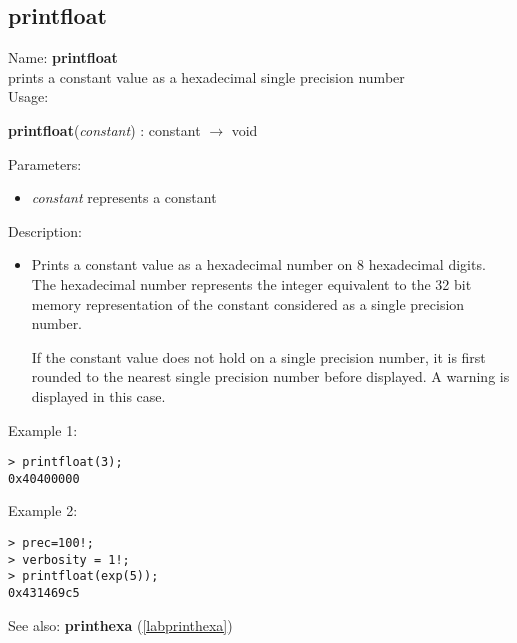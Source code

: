 \subsection{printfloat}
\label{labprintfloat}
\noindent Name: \textbf{printfloat}\\
prints a constant value as a hexadecimal single precision number\\

\noindent Usage: 
\begin{center}
\textbf{printfloat}(\emph{constant}) : \textsf{constant} $\rightarrow$ \textsf{void}\\
\end{center}
Parameters: 
\begin{itemize}
\item \emph{constant} represents a constant
\end{itemize}
\noindent Description: \begin{itemize}

\item Prints a constant value as a hexadecimal number on 8 hexadecimal
   digits. The hexadecimal number represents the integer equivalent to
   the 32 bit memory representation of the constant considered as a
   single precision number.
    
   If the constant value does not hold on a single precision number, it
   is first rounded to the nearest single precision number before
   displayed. A warning is displayed in this case.
\end{itemize}
\noindent Example 1: 
\begin{center}\begin{minipage}{15cm}\begin{Verbatim}[frame=single]
> printfloat(3);
0x40400000
\end{Verbatim}
\end{minipage}\end{center}
\noindent Example 2: 
\begin{center}\begin{minipage}{15cm}\begin{Verbatim}[frame=single]
> prec=100!;
> verbosity = 1!;
> printfloat(exp(5));
0x431469c5
\end{Verbatim}
\end{minipage}\end{center}
See also: \textbf{printhexa} (\ref{labprinthexa})
